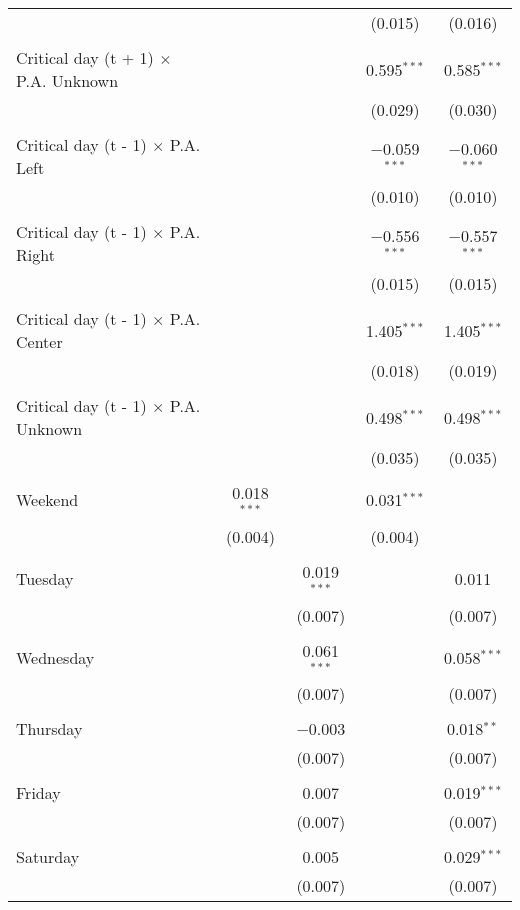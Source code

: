 \documentclass[
]{article}
\begin{document}
\begin{table}[!htbp]
{\begin{tabular}{@{\extracolsep{5pt}}lcccc}
  &  &  & (0.015) & (0.016) \\ 
  & & & & \\ 
 Critical day (t + 1) $\times$ P.A. Unknown &  &  & 0.595$^{***}$ & 0.585$^{***}$ \\ 
  &  &  & (0.029) & (0.030) \\ 
  & & & & \\ 
 Critical day (t - 1) $\times$ P.A. Left &  &  & $-$0.059$^{***}$ & $-$0.060$^{***}$ \\ 
  &  &  & (0.010) & (0.010) \\ 
  & & & & \\ 
 Critical day (t - 1) $\times$ P.A. Right &  &  & $-$0.556$^{***}$ & $-$0.557$^{***}$ \\ 
  &  &  & (0.015) & (0.015) \\ 
  & & & & \\ 
 Critical day (t - 1) $\times$ P.A. Center &  &  & 1.405$^{***}$ & 1.405$^{***}$ \\ 
  &  &  & (0.018) & (0.019) \\ 
  & & & & \\ 
 Critical day (t - 1) $\times$ P.A. Unknown &  &  & 0.498$^{***}$ & 0.498$^{***}$ \\ 
  &  &  & (0.035) & (0.035) \\ 
  & & & & \\ 
 Weekend & 0.018$^{***}$ &  & 0.031$^{***}$ &  \\ 
  & (0.004) &  & (0.004) &  \\ 
  & & & & \\ 
 Tuesday &  & 0.019$^{***}$ &  & 0.011 \\ 
  &  & (0.007) &  & (0.007) \\ 
  & & & & \\ 
 Wednesday &  & 0.061$^{***}$ &  & 0.058$^{***}$ \\ 
  &  & (0.007) &  & (0.007) \\ 
  & & & & \\ 
 Thursday &  & $-$0.003 &  & 0.018$^{**}$ \\ 
  &  & (0.007) &  & (0.007) \\ 
  & & & & \\ 
 Friday &  & 0.007 &  & 0.019$^{***}$ \\ 
  &  & (0.007) &  & (0.007) \\ 
  & & & & \\ 
 Saturday &  & 0.005 &  & 0.029$^{***}$ \\ 
  &  & (0.007) &  & (0.007) \\ 

\end{tabular}}
\end{table}
\end{document}
